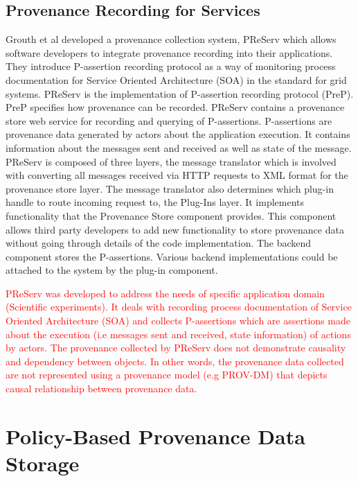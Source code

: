 \subsection{Provenance Recording for Services}
Grouth et al \cite{groth} developed a provenance collection system, PReServ which allows software developers to integrate provenance recording into their applications. They introduce P-assertion recording protocol as a way of monitoring process  documentation for Service Oriented Architecture (SOA) in the standard for grid systems. PReServ is the implementation of P-assertion recording protocol (PreP). PreP specifies how provenance can be recorded. PReServ contains a provenance store web service for recording and querying of P-assertions. P-assertions are provenance data generated by actors about the application execution. It contains information about the messages sent and received as well as state of the message. PReServ is composed of three layers, the message translator which is involved with converting all messages received via HTTP requests to XML format for the provenance store layer. The message translator also determines which plug-in handle to route incoming request to, the  Plug-Ins layer. It implements functionality that the Provenance Store component provides. This component allows third party developers to add new functionality to store provenance data without going through details of the code implementation. The backend component stores the P-assertions. Various backend implementations could be attached to the system by the plug-in component.



\textcolor{red}{PReServ was developed to address the needs of specific application domain (Scientific experiments). It deals with recording process documentation of Service Oriented Architecture (SOA) and collects P-assertions which are assertions made about the execution (i.e messages sent and received, state information) of actions by actors. The provenance collected by PReServ does not demonstrate causality and dependency between objects. In other words, the provenance data collected are not represented using a provenance model (e.g PROV-DM) that depicts causal relationship between provenance data. }





\section{Policy-Based Provenance Data Storage}


